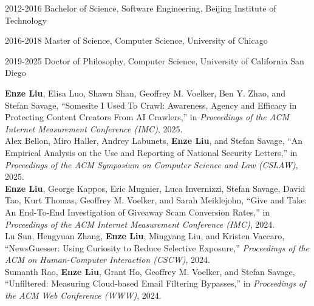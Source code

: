 \documentclass[12pt]{ucsddissertation}
\begin{document}
\begin{vita}
\noindent
\begin{cv}{}
\begin{cvlist}{}
\item[2012-2016] Bachelor of Science, Software Engineering, Beijing Institute of Technology
\item[2016-2018] Master of Science, Computer Science, University of Chicago
\item[2019-2025] Doctor of Philosophy, Computer Science, University of California San Diego

\end{cvlist}
\end{cv}

\publications

\noindent \textbf{Enze Liu}, Elisa Luo, Shawn Shan, Geoffrey M. Voelker, Ben Y. Zhao, and Stefan Savage, ``Somesite I Used To Crawl: Awareness, Agency and Efficacy in Protecting Content Creators From AI Crawlers,'' in \textit{Proceedings of the ACM Internet Measurement Conference (IMC)}, 2025.\\

\noindent Alex Bellon, Miro Haller, Andrey Labunets, \textbf{Enze Liu}, and Stefan Savage, ``An Empirical Analysis on the Use and Reporting of National Security Letters,'' in \textit{Proceedings of the ACM Symposium on Computer Science and Law (CSLAW)}, 2025.\\


\noindent \textbf{Enze Liu}, George Kappos, Eric Mugnier, Luca Invernizzi, Stefan Savage, David Tao, Kurt Thomas, Geoffrey M. Voelker, and Sarah Meiklejohn, ``Give and Take: An End-To-End Investigation of Giveaway Scam Conversion Rates,'' in \textit{Proceedings of the ACM Internet Measurement Conference (IMC)}, 2024.\\

\noindent Lu Sun, Hengyuan Zhang, \textbf{Enze Liu}, Mingyang Liu, and Kristen Vaccaro, ``NewsGuesser: Using Curiosity to Reduce Selective Exposure,'' \textit{Proceedings of the ACM on Human-Computer Interaction (CSCW)}, 2024.\\

\noindent Sumanth Rao, \textbf{Enze Liu}, Grant Ho, Geoffrey M. Voelker, and Stefan Savage, ``Unfiltered: Measuring Cloud-based Email Filtering Bypasses,'' in \textit{Proceedings of the ACM Web Conference (WWW)}, 2024.\\


\end{vita}
\end{document}
